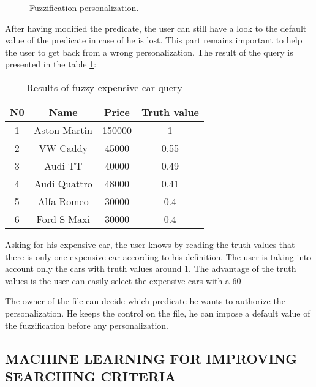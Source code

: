 \documentclass[a4paper,twoside]{article}
\begin{document}
\begin{figure}[!h]
  \centering
   {}
  \caption{Fuzzification personalization.}
  \label{fig:fuzzypers}
 \end{figure}

After having modified the predicate, the user can still have a look to the default value of the predicate in case of he is lost. This part remains important to help the user to get back from a wrong personalization. The result of the query is presented in the table \ref{tab:solveQuery1}:  \\ 

\begin{table}[h]
\caption{Results of fuzzy expensive car query}\label{tab:solveQuery1} \centering
\begin{tabular}{|c|c|c|c|}
  \hline
  N0 & Name & Price & Truth value\\
  \hline
  1 & Aston Martin & 150000 & 1 \\
  \hline
  2 & VW Caddy & 45000 & 0.55\\
  \hline
  3 & Audi TT & 40000 & 0.49 \\
  \hline
  4 & Audi Quattro & 48000 & 0.41 \\ 
  \hline
  5 & Alfa Romeo & 30000 & 0.4 \\
  \hline
  6 & Ford S Maxi & 30000 & 0.4 \\
  \hline
\end{tabular}
\end{table}


Asking for his expensive car, the user knows by reading the truth values that there is only one expensive car according to his definition. The user is taking into account only the cars with truth values around 1. The advantage of the truth values is the user can easily select the expensive cars with a 60%

The owner of the file can decide which predicate he wants to authorize the personalization. He keeps the control on the file, he can impose a default value of the fuzzification before any personalization. \\

\subsection{\uppercase{Machine learning for improving searching criteria}}
\end{document}
